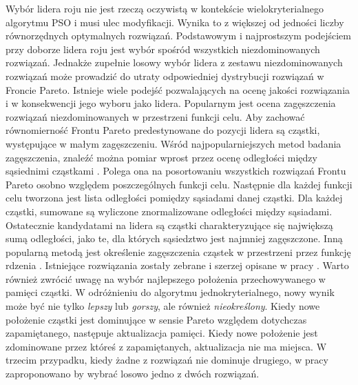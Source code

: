 Wybór lidera roju nie jest rzeczą oczywistą w kontekście wielokryterialnego algorytmu PSO i musi ulec modyfikacji. Wynika to z większej od jedności liczby równorzędnych optymalnych rozwiązań. Podstawowym i najprostszym podejściem przy doborze lidera roju jest wybór spośród wszystkich niezdominowanych rozwiązań. Jednakże zupełnie losowy wybór lidera z zestawu niezdominowanych rozwiązań może prowadzić do utraty odpowiedniej dystrybucji rozwiązań w Froncie Pareto. Istnieje wiele podejść pozwalających na ocenę jakości rozwiązania i w konsekwencji jego wyboru jako lidera. Popularnym jest ocena zagęszczenia rozwiązań niezdominowanych w przestrzeni funkcji celu. Aby zachować równomierność Frontu Pareto predestynowane do pozycji lidera są cząstki, występujące w małym zagęszczeniu. Wśród najpopularniejszych metod badania zagęszczenia, znaleźć można pomiar wprost przez ocenę odległości między sąsiednimi cząstkami \parencite{Deb2002}. Polega ona na posortowaniu wszystkich rozwiązań Frontu Pareto osobno względem poszczególnych funkcji celu. Następnie dla każdej funkcji celu tworzona jest lista odległości pomiędzy sąsiadami danej cząstki. Dla każdej cząstki, sumowane są wyliczone znormalizowane odległości między sąsiadami. Ostatecznie kandydatami na lidera są cząstki charakteryzujące się największą sumą odległości, jako te, dla których sąsiedztwo jest najmniej zagęszczone. Inną popularną metodą jest określenie zagęszczenia cząstek w przestrzeni przez funkcję rdzenia \parencite{Deb1989}. Istniejące rozwiązania zostały zebrane i szerzej opisane w pracy \parencite{CoelloCoello2006}. Warto również zwrócić uwagę na wybór najlepszego położenia przechowywanego w pamięci cząstki. W odróżnieniu do algorytmu jednokryterialnego, nowy wynik może być nie tylko \textit{lepszy} lub \textit{gorszy}, ale również \textit{nieokreślony}. Kiedy nowe położenie cząstki jest dominujące w sensie Pareto względem dotychczas zapamiętanego, następuje aktualizacja pamięci. Kiedy nowe położenie jest zdominowane przez któreś z zapamiętanych, aktualizacja nie ma miejsca. W trzecim przypadku, kiedy żadne z rozwiązań nie dominuje drugiego, w pracy \cite{CoelloCoello2002} zaproponowano by wybrać losowo jedno z dwóch rozwiązań.

